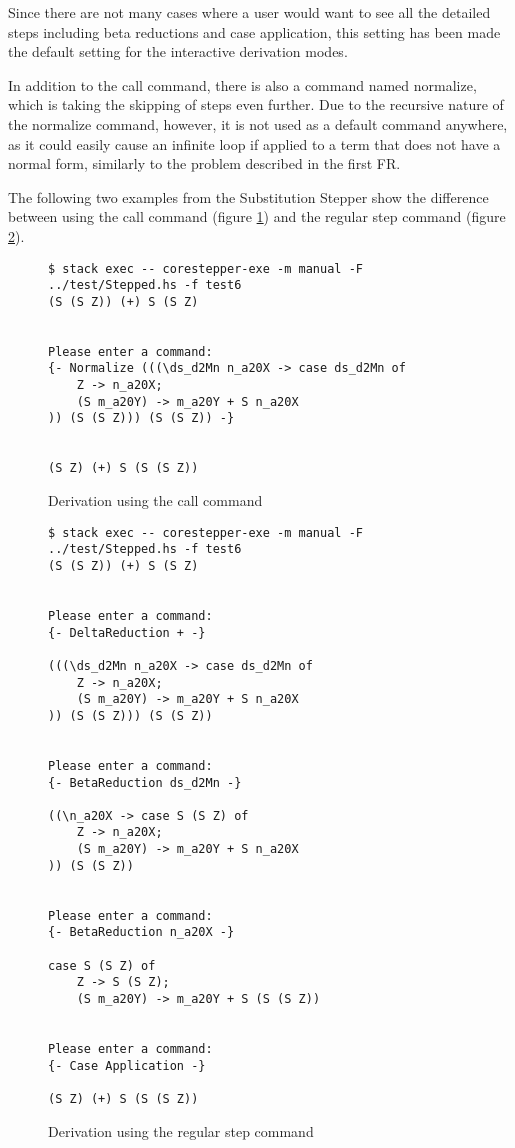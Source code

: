 Since there are not many cases where a user would want to see all the detailed steps including beta reductions and case application,
this setting has been made the default setting for the interactive derivation modes.

In addition to the call command, there is also a command named normalize,
which is taking the skipping of steps even further.
Due to the recursive nature of the normalize command, however,
it is not used as a default command anywhere, as it could easily cause an infinite loop if applied to a term that does not have a normal form,
similarly to the problem described in the first FR.

The following two examples from the Substitution Stepper show the difference between using the call command (figure \ref*{fig:FR2exampleCall}) and the regular step command (figure \ref*{fig:FR2exampleStep}).

\begin{figure}[!ht]
\begin{verbatim}
$ stack exec -- corestepper-exe -m manual -F ../test/Stepped.hs -f test6
(S (S Z)) (+) S (S Z)


Please enter a command:
{- Normalize (((\ds_d2Mn n_a20X -> case ds_d2Mn of
    Z -> n_a20X;
    (S m_a20Y) -> m_a20Y + S n_a20X
)) (S (S Z))) (S (S Z)) -}


(S Z) (+) S (S (S Z))
\end{verbatim}
\caption{Derivation using the call command}
\label{fig:FR2exampleCall}
\end{figure}

\begin{figure}[!ht]
\begin{verbatim}
$ stack exec -- corestepper-exe -m manual -F ../test/Stepped.hs -f test6
(S (S Z)) (+) S (S Z)


Please enter a command:
{- DeltaReduction + -}

(((\ds_d2Mn n_a20X -> case ds_d2Mn of
    Z -> n_a20X;
    (S m_a20Y) -> m_a20Y + S n_a20X
)) (S (S Z))) (S (S Z))


Please enter a command:
{- BetaReduction ds_d2Mn -}

((\n_a20X -> case S (S Z) of
    Z -> n_a20X;
    (S m_a20Y) -> m_a20Y + S n_a20X
)) (S (S Z))


Please enter a command:
{- BetaReduction n_a20X -}

case S (S Z) of
    Z -> S (S Z);
    (S m_a20Y) -> m_a20Y + S (S (S Z))


Please enter a command:
{- Case Application -}

(S Z) (+) S (S (S Z))
\end{verbatim}
\caption{Derivation using the regular step command}
\label{fig:FR2exampleStep}
\end{figure}

